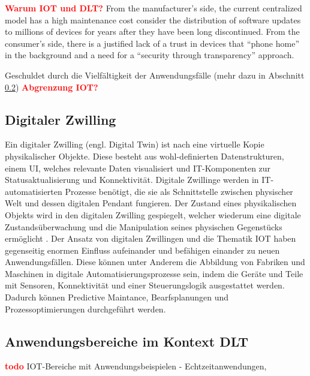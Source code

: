 \textbf{\textcolor{red}{Warum IOT und DLT?}}
\cite{SCIOT2016}
From the manufacturer's side, the current centralized model has a high maintenance cost consider the distribution of software updates to millions of devices for years after they have been long discontinued. From the consumer's side, there is a justified lack of a trust in devices that ``phone home'' in the background and a need for a ``security through transparency'' approach.

Geschuldet durch die Vielfältigkeit der Anwendungsfälle (mehr dazu in Abschnitt \ref{subsec:fundamentals:iot:usecases})
\textbf{\textcolor{red}{Abgrenzung IOT?}}

\subsection{Digitaler Zwilling}
\label{subsec:fundamentals:iot:digitaltwins}
Ein digitaler Zwilling (engl. Digital Twin) ist nach \cite{deloitte2018} eine virtuelle Kopie physikalischer Objekte. Diese besteht aus wohl-definierten Datenstrukturen, einem \ac{UI}, welches relevante Daten visualisiert und IT-Komponenten zur Statusaktualisierung und Konnektivität. Digitale Zwillinge werden in IT-automatisierten Prozesse benötigt, die sie als Schnittstelle zwischen physischer Welt und dessen digitalen Pendant fungieren. Der Zustand eines physikalischen Objekts wird in den digitalen Zwilling gespiegelt, welcher wiederum eine digitale Zustandsüberwachung und die Manipulation seines physischen Gegenstücks ermöglicht \cite{deloitte2018}. Der Ansatz von digitalen Zwillingen und die Thematik \ac{IOT} haben gegenseitig enormen Einfluss aufeinander und befähigen einander zu neuen Anwendungsfällen. Diese können unter Anderem die Abbildung von Fabriken und Maschinen in digitale Automatisierungsprozesse sein, indem die Geräte und Teile mit Sensoren, Konnektivität und einer Steuerungslogik ausgestattet werden. Dadurch können Predictive Maintance, Bearfsplanungen und Prozessoptimierungen durchgeführt werden.


\subsection{Anwendungsbereiche im Kontext DLT}
\label{subsec:fundamentals:iot:usecases}
\textbf{\textcolor{red}{todo}}
IOT-Bereiche mit Anwendungsbeispielen - Echtzeitanwendungen,
